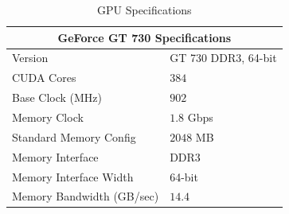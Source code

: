 \begin{table}
	\centering
	\caption{GPU Specifications}
	\label{tab:gpu_specs}
	\begin{tabular}{ll}
		\toprule[1.25pt]
		\multicolumn{2}{c}{GeForce GT 730 Specifications}  \\
		\midrule
		Version                    & GT 730  DDR3, 64-bit  \\
		CUDA Cores                 & $384$                   \\
		Base Clock (MHz)           & $902$                   \\
		Memory Clock               & $1.8$ Gbps              \\
		Standard Memory Config     & $2048$ MB               \\
		Memory Interface           & DDR3                  \\
		Memory Interface Width     & 64-bit                \\
		Memory Bandwidth (GB/sec)  & $14.4$                  \\
		\bottomrule[1.25pt] 
	\end{tabular}
\end{table}




